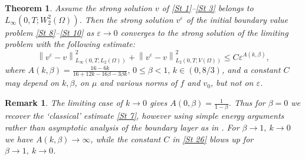 \documentclass[11pt]{article}
\newtheorem{theorem}{Theorem}
\newtheorem{remark}{Remark}
\begin{document}
\begin{theorem}{Assume  the strong solution $v$ of  \eqref{St 1}--\eqref{St 3} belongs to $L_\infty(0,T;W^2_2(\Omega))$.} Then the strong solution $v^{\varepsilon}$ of the initial boundary value problem \eqref{St 8}--\eqref{St 10} as $\varepsilon \rightarrow 0$ converges to the strong solution of the limiting problem with the following estimate:
\begin{equation} \label{St 26}
    \left\| v^{\varepsilon} - v \right\|_{L_\infty(0,T;L_2(\Omega))}^2 + \left\| v^{\varepsilon} - v \right\|_{L_2(0,T;V(\Omega))}^2 \leq C \varepsilon^{A(k, \beta)},  
\end{equation} 
where $A(k, \beta) = \frac{{16-6k}}{16+12k-16\beta-3\beta k},\, 0 \leq \beta < 1, \, k\in(0,8/3)$, and a constant $C$ may depend on $k,\beta$, {on $\mu$} and various norms of $f$ and $v_0$, but not on $\varepsilon$.
\end{theorem}

\begin{remark}\label{Rem2}\rm 
{The limiting case of $k\to 0$ gives $A(0, \beta) = \frac{1}{1-\beta}$. 
Thus for $\beta=0$ we recover the `classical' estimate  \eqref{St 7}, however using simple energy arguments rather than asymptotic analysis of the boundary layer as in \cite{carbou2003boundary}.   For  
 $\beta \rightarrow 1,\ k\rightarrow 0$ we have  $A(k, \beta) \rightarrow \infty$, while the constant $C$ in \eqref{St 26} blows up for $\beta \rightarrow 1,\ k\rightarrow 0$.   }
\end{remark}
\end{document}
